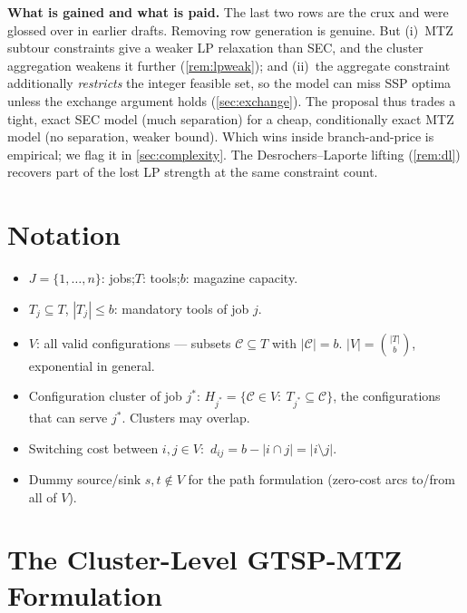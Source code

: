 \documentclass[11pt,a4paper]{article}
\theoremstyle{plain}
\theoremstyle{definition}
\begin{document}
\begin{warnbox}
\textbf{What is gained and what is paid.}
The last two rows are the crux and were glossed over in earlier drafts. Removing row
generation is genuine. But (i)~MTZ subtour constraints give a weaker LP relaxation than SEC,
and the cluster aggregation weakens it further (\cref{rem:lpweak}); and (ii)~the aggregate
constraint additionally \emph{restricts} the integer feasible set, so the model can miss SSP
optima unless the exchange argument holds (\cref{sec:exchange}). The proposal thus trades a
tight, exact SEC model (much separation) for a cheap, conditionally exact MTZ model (no
separation, weaker bound). Which wins inside branch-and-price is empirical; we flag it in
\cref{sec:complexity}. The Desrochers--Laporte lifting (\cref{rem:dl}) recovers part of the
lost LP strength at the same constraint count.
\end{warnbox}

\section{Notation}
\label{sec:notation}

\begin{itemize}
	\item $J=\{1,\dots,n\}$: jobs;\quad $T$: tools;\quad $b$: magazine capacity.
	\item $T_j\subseteq T$, $|T_j|\le b$: mandatory tools of job $j$.
	\item $V$: all valid configurations --- subsets $\mathcal{C}\subseteq T$ with
	$|\mathcal{C}|=b$. $|V|=\binom{|T|}{b}$, exponential in general.
	\item Configuration cluster of job $j^{*}$:
	$\displaystyle H_{j^{*}}=\bigl\{\mathcal{C}\in V:\ T_{j^{*}}\subseteq\mathcal{C}\bigr\}$,
	the configurations that can serve $j^{*}$. Clusters may overlap.
	\item Switching cost between $i,j\in V$:\ $d_{ij}=b-|i\cap j|=|i\setminus j|$.
	\item Dummy source/sink $s,t\notin V$ for the path formulation (zero-cost arcs to/from
	all of $V$).
\end{itemize}

\section{The Cluster-Level GTSP-MTZ Formulation}
\label{sec:formulation}
\end{document}
